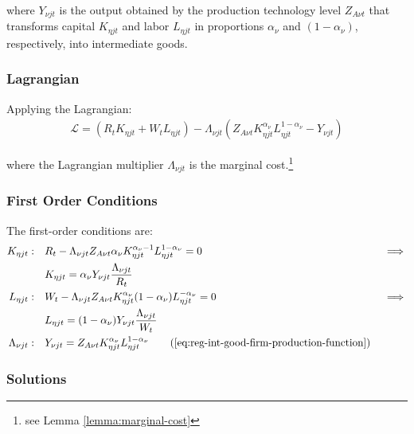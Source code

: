 \documentclass[
thesis.tex
]{subfiles}
\begin{document}
where $Y_{\nu jt}$ is the output obtained by the production technology level $Z_{A\nu t}$\footnotemark{} that transforms capital $K_{\eta jt}$ and labor $L_{\eta jt}$ in proportions ${\alpha_\nu}$ and $(1-{\alpha_\nu})$, respectively, into intermediate goods.


\subsubsection*{Lagrangian}

Applying the Lagrangian:
\begin{align}
	\label{eq:reg-int-good-firm-lagrangian}
	\mathcal{L} = (R_t K_{\eta jt} + W_t L_{\eta jt}) - \Lambda_{\nu jt} (Z_{A\nu t} K_{\eta jt}^{\alpha_\nu} L_{\eta jt}^{1-{\alpha_\nu}} - Y_{\nu jt})
\end{align}

where the Lagrangian multiplier $\Lambda_{\nu jt}$ is the marginal cost.\footnote{see Lemma \ref{lemma:marginal-cost}}

\subsubsection*{First Order Conditions}

The first-order conditions are:
\begin{alignat}{2}
	K_{\eta jt}: \quad & R_t - \Lambda_{\nu jt} Z_{A\nu t} {\alpha_\nu} K_{\eta jt}^{{\alpha_\nu}-1} L_{\eta jt}^{1-{\alpha_\nu}} = 0 &&\implies \nonumber \\
	& K_{\eta jt} = {\alpha_\nu} Y_{\nu jt} \frac{\Lambda_{\nu jt}}{R_t} \label{eq:reg-int-good-firm-FOC-Kt} \\
	L_{\eta jt}: \quad & W_t - \Lambda_{\nu jt} Z_{A\nu t} K_{\eta jt}^{\alpha_\nu} (1-{\alpha_\nu}) L_{\eta jt}^{-{\alpha_\nu}} = 0 \quad &&\implies \nonumber \\ 
	& L_{\eta jt} = (1-{\alpha_\nu}) Y_{\nu jt} \frac{\Lambda_{\nu jt}}{W_t} \label{eq:reg-int-good-firm-FOC-Lt} \\
	\Lambda_{\nu jt}: \quad & Y_{\nu jt} = Z_{A\nu t} K_{\eta jt}^{\alpha_\nu} L_{\eta jt}^{1-{\alpha_\nu}} \tag{\ref{eq:reg-int-good-firm-production-function}}
\end{alignat}

\subsubsection*{Solutions}
\end{document}

